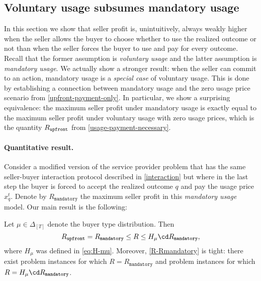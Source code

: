 \subsection{Voluntary usage subsumes mandatory usage} \label{voluntary-usage}

In this section we show that seller profit is, unintuitively, always weakly higher when the seller allows the buyer to choose whether to use the realized outcome or not than when the seller forces the buyer to use and pay for every outcome. Recall that the former assumption is \emph{voluntary usage} and the latter assumption is \emph{mandatory usage}. We actually show a stronger result: when the seller can commit to an action, mandatory usage is a \emph{special case} of voluntary usage. This is done by establishing a connection between mandatory usage and the zero usage price scenario from \cref{upfront-payment-only}. In particular, we show a surprising equivalence: the maximum seller profit under mandatory usage is exactly equal to the maximum seller profit under voluntary usage with zero usage prices, which is the quantity $R_\mathtt{upfront}$ from \cref{usage-payment-necessary}.


\paragraph{Quantitative result.}

\newcommand{\Rmandatory}{R_\mathtt{mandatory}}

Consider a modified version of the service provider problem that has the same seller-buyer interaction protocol described in \cref{interaction} but where in the last step the buyer is forced to accept the realized outcome $q$ and pay the usage price $x^t_q$. Denote by $\Rmandatory$ the maximum seller profit in this \emph{mandatory usage} model. Our main result is the following:

\begin{theorem} \label{voluntary-usage-subsumes}
 Let $\mu \in \Delta_{[T]}$ denote the buyer type distribution. Then
 \begin{equation} \label{R-Rmandatory}
     \Rupfront = \Rmandatory \le R \le H_\mu \cd \Rmandatory,
 \end{equation}
where $H_\mu$ was defined in \cref{eq:H-mu}. Moreover, \cref{R-Rmandatory} is tight: there exist problem instances for which $R = \Rmandatory$ and problem instances for which $R =  H_\mu \cd \Rmandatory$.
\end{theorem}

